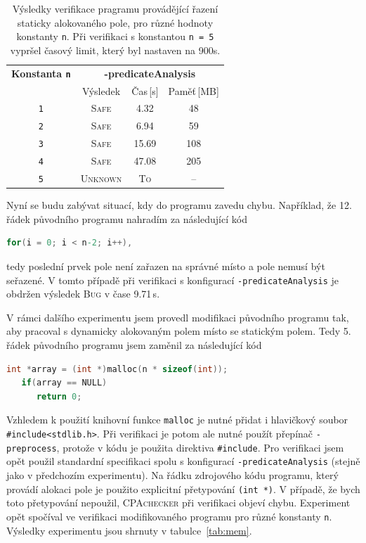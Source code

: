 \documentclass[a4paper,12pt]{article}
\begin{document}
\begin{table}[h!]
\renewcommand{\arraystretch}{1.2}
\begin{center}
  \begin{tabular}{| c | c  c  c |}
    \hline
   \multicolumn{1}{|c|}{\bf Konstanta \texttt{n}} & \multicolumn{3}{c|}{\small\bf -predicateAnalysis}  \\
     &  Výsledek & Čas\,[s] & Paměť\,[MB] \\
    \hline\hline
    {\texttt{1}} & \textsc{Safe} & 4.32 & 48 \\\hline
    {\texttt{2}} & \textsc{Safe} & 6.94 & 59 \\ \hline
    {\texttt{3}} & \textsc{Safe} & 15.69 & 108 \\ \hline
    {\texttt{4}} & \textsc{Safe} & 47.08 & 205 \\ \hline
    {\texttt{5}} & \textsc{Unknown} & \textsc{To} & -- \\
    \hline
  \end{tabular}
\end{center}
\caption{Výsledky verifikace pragramu provádějící řazení staticky alokovaného pole, pro různé hodnoty konstanty \texttt{n}. Při verifikaci s konstantou \texttt{n = 5} vypršel časový limit, který 
byl nastaven na 900s.}
\label{tab:selSort}
\end{table}

Nyní se budu zabývat situací, kdy do programu zavedu chybu. Například, že 12. řádek původního programu nahradím za následující kód
\begin{lstlisting}[language=C]
   for(i = 0; i < n-2; i++),
\end{lstlisting}
tedy poslední prvek pole není zařazen na správné místo a pole nemusí být seřazené. V tomto případě při verifikaci s 
konfigurací \texttt{-predicateAnalysis} je obdržen výsledek \textsc{Bug} v čase 9.71\,s. 

V rámci dalšího experimentu jsem provedl modifikaci původního programu tak, aby pracoval s dynamicky alokovaným polem místo se statickým polem.
Tedy 5. řádek původního programu jsem zaměnil za následující kód
\begin{lstlisting}[language=C]
   int *array = (int *)malloc(n * sizeof(int));
   if(array == NULL)
      return 0;
\end{lstlisting}
Vzhledem k použití knihovní funkce \texttt{malloc} je nutné přidat i hlavičkový soubor \texttt{\#include<stdlib.h>}.
Při verifikaci je potom ale nutné použít přepínač \texttt{-preprocess}, protože v kódu je použita direktiva \texttt{\#include}.
Pro verifikaci jsem opět použil standardní specifikaci spolu s konfigurací \texttt{-predicateAnalysis} (stejně jako v předchozím
experimentu). Na řádku zdrojového kódu programu, který provádí alokaci pole je použito explicitní přetypování \texttt{(int *)}. V
případě, že bych toto přetypování nepoužil, \textsc{CPAchecker} při verifikaci objeví chybu. Experiment opět
spočíval ve verifikaci modifikovaného programu pro různé konstanty \texttt{n}. Výsledky experimentu jsou shrnuty
v tabulce~\ref{tab:mem}.
\end{document}
